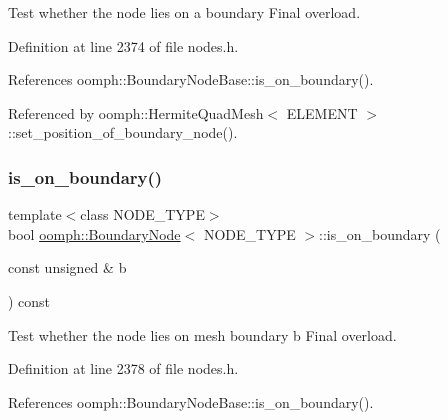Test whether the node lies on a boundary Final overload. 



Definition at line 2374 of file nodes.\+h.



References oomph\+::\+Boundary\+Node\+Base\+::is\+\_\+on\+\_\+boundary().



Referenced by oomph\+::\+Hermite\+Quad\+Mesh$<$ E\+L\+E\+M\+E\+N\+T $>$\+::set\+\_\+position\+\_\+of\+\_\+boundary\+\_\+node().

\mbox{\label{classoomph_1_1BoundaryNode_afd7aca2edeec2464ed080163b90d26a1}} 
\subsubsection{\texorpdfstring{is\+\_\+on\+\_\+boundary()}{is\_on\_boundary()}\hspace{0.1cm}{\footnotesize\ttfamily [2/2]}}
{\footnotesize\ttfamily template$<$class N\+O\+D\+E\+\_\+\+T\+Y\+PE$>$ \\
bool \hyperlink{classoomph_1_1BoundaryNode}{oomph\+::\+Boundary\+Node}$<$ N\+O\+D\+E\+\_\+\+T\+Y\+PE $>$\+::is\+\_\+on\+\_\+boundary (\begin{DoxyParamCaption}\item[{const unsigned \&}]{b }\end{DoxyParamCaption}) const\hspace{0.3cm}{\ttfamily [inline]}}



Test whether the node lies on mesh boundary b Final overload. 



Definition at line 2378 of file nodes.\+h.



References oomph\+::\+Boundary\+Node\+Base\+::is\+\_\+on\+\_\+boundary().

\mbox{\label{classoomph_1_1BoundaryNode_a96a34bd1911f8a125be570f361d3a211}} 
